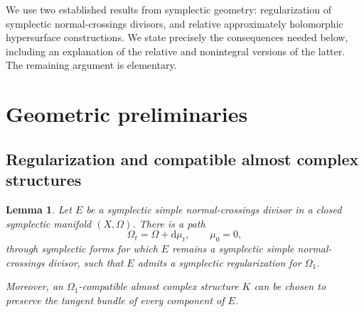 \documentclass[11pt]{amsart}
\newtheorem{lemma}[theorem]{Lemma}
\theoremstyle{definition}
\theoremstyle{remark}
\newcommand{\dd}{\mathrm d}
\begin{document}
We use two established results from symplectic geometry:
regularization of symplectic normal-crossings divisors, and relative
approximately holomorphic hypersurface constructions.  We state
precisely the consequences needed below, including an explanation of
the relative and nonintegral versions of the latter.  The remaining
argument is elementary.

\section{Geometric preliminaries}

\subsection{Regularization and compatible almost complex structures}

\begin{lemma}\label{lem:regularization}
Let $E$ be a symplectic simple normal-crossings divisor in a closed
symplectic manifold $(X,\Omega)$.  There is a path
\[
\Omega_t=\Omega+\dd\mu_t,\qquad \mu_0=0,
\]
through symplectic forms for which $E$ remains a symplectic simple
normal-crossings divisor, such that $E$ admits a symplectic
regularization for $\Omega_1$.

Moreover, an $\Omega_1$-compatible almost complex structure $K$ can
be chosen to preserve the tangent bundle of every component of $E$.
\end{lemma}
\end{document}
